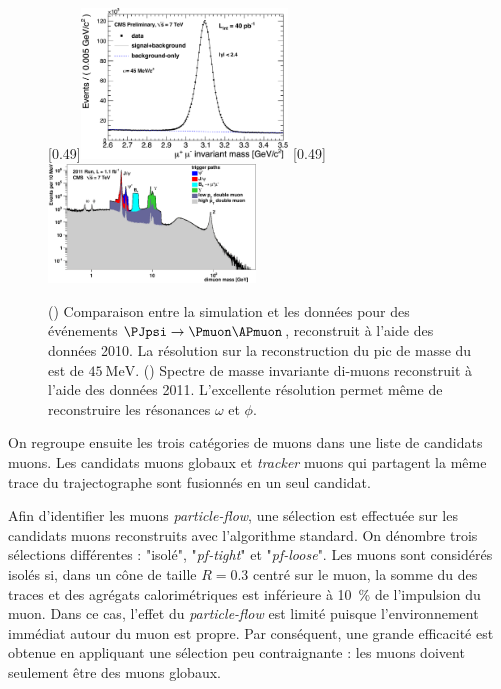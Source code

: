 \begin{figure}[tbp]
    \centering
    \subcaptionbox{\label{fig:dimu_jpsi}}[0.49\textwidth]{\includegraphics[width=0.49\textwidth]{chapitre3/figs/JPsi40pb-1.pdf}} \hfill
    \subcaptionbox{\label{fig:dimu_mass}}[0.49\textwidth]{\includegraphics[width=0.49\textwidth]{chapitre3/figs/mass_dimu.pdf}}
    \caption{() Comparaison entre la simulation et les données pour des événements $\PJpsi \rightarrow \Pmuon \APmuon$, reconstruit à l'aide des données 2010. La résolution sur la reconstruction du pic de masse du \PJpsi est de $\SI{45}{\MeV}$. () Spectre de masse invariante di-muons reconstruit à l'aide des données 2011. L'excellente résolution permet même de reconstruire les résonances $\omega$ et $\phi$.}
    \label{fig:dimu_mass_spectrum}
\end{figure}

On regroupe ensuite les trois catégories de muons dans une liste de candidats muons. Les candidats muons globaux et \emph{tracker} muons qui partagent la même trace du trajectographe sont fusionnés en un seul candidat.

Afin d'identifier les muons \emph{particle-flow}, une sélection est effectuée sur les candidats muons reconstruits avec l'algorithme standard. On dénombre trois sélections différentes : "isolé", "\emph{pf-tight}" et "\emph{pf-loose}". Les muons sont considérés isolés si, dans un cône de taille $R = \num{0.3}$ centré sur le muon, la somme du \pt des traces et des agrégats calorimétriques est inférieure à \SI{10}{\%} de l'impulsion du muon. Dans ce cas, l'effet du \emph{particle-flow} est limité puisque l'environnement immédiat autour du muon est propre. Par conséquent, une grande efficacité est obtenue en appliquant une sélection peu contraignante : les muons doivent seulement être des muons globaux.

